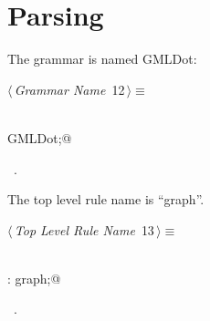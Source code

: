 \documentclass[a4paper]{report}
\begin{document}
\section{Parsing}
The grammar is named GMLDot:
\begin{flushleft} \small
\begin{minipage}{\linewidth}\label{scrap12}\raggedright\small
{} $\langle\,${\itshape Grammar Name}\nobreak\ {\footnotesize {12}}$\,\rangle\equiv$
\vspace{-1ex}
\begin{list}{}{} \item
\mbox{}\verb@@\\
\mbox{}\verb@grammar GMLDot;@\\
\mbox{}\verb@@{\NWsep}
\end{list}
\vspace{-1.5ex}
\footnotesize
\begin{list}{}{\setlength{\itemsep}{-\parsep}\setlength{\itemindent}{-\leftmargin}}
\item \NWtxtMacroRefIn\ .

\item{}
\end{list}
\end{minipage}\vspace{4ex}
\end{flushleft}
The top level rule name is ``graph''.
\begin{flushleft} \small
\begin{minipage}{\linewidth}\label{scrap13}\raggedright\small
{} $\langle\,${\itshape Top Level Rule Name}\nobreak\ {\footnotesize {13}}$\,\rangle\equiv$
\vspace{-1ex}
\begin{list}{}{} \item
\mbox{}\verb@@\\
\mbox{}\verb@r: graph;@\\
\mbox{}\verb@@{\NWsep}
\end{list}
\vspace{-1.5ex}
\footnotesize
\begin{list}{}{\setlength{\itemsep}{-\parsep}\setlength{\itemindent}{-\leftmargin}}
\item \NWtxtMacroRefIn\ .

\item{}
\end{list}
\end{minipage}\vspace{4ex}
\end{flushleft}
\end{document}

